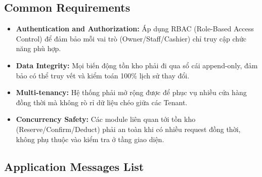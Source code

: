 \subsection{Common Requirements}
\begin{itemize}
    \item \textbf{Authentication and Authorization:} Áp dụng RBAC (Role-Based Access Control) để đảm bảo mỗi vai trò (Owner/Staff/Cashier) chỉ truy cập chức năng phù hợp.
    \item \textbf{Data Integrity:} Mọi biến động tồn kho phải đi qua sổ cái append-only, đảm bảo có thể truy vết và kiểm toán 100\% lịch sử thay đổi.
    \item \textbf{Multi-tenancy:} Hệ thống phải mở rộng được để phục vụ nhiều cửa hàng đồng thời mà không rò rỉ dữ liệu chéo giữa các Tenant.
    \item \textbf{Concurrency Safety:} Các module liên quan tới tồn kho (Reserve/Confirm/Deduct) phải an toàn khi có nhiều request đồng thời, không phụ thuộc vào kiểm tra ở tầng giao diện.
\end{itemize}

\subsection{Application Messages List}

